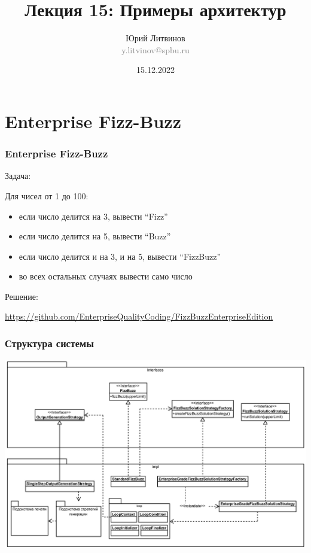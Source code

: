 \documentclass[xetex,mathserif,serif]{beamer}
\title{Лекция 15: Примеры архитектур}
\author[Юрий Литвинов]{Юрий Литвинов\\\small{\textcolor{gray}{y.litvinov@spbu.ru}}}
\date{15.12.2022}
\begin{document}
    \frame{\titlepage}
    \section{Enterprise Fizz-Buzz}

    \begin{frame}
        \frametitle{Enterprise Fizz-Buzz}
        Задача:

        Для чисел от 1 до 100:
        \begin{itemize}
            \item если число делится на 3, вывести ``Fizz''
            \item если число делится на 5, вывести ``Buzz''
            \item если число делится и на 3, и на 5, вывести ``FizzBuzz''
            \item во всех остальных случаях вывести само число
        \end{itemize}

        Решение:

        \url{https://github.com/EnterpriseQualityCoding/FizzBuzzEnterpriseEdition}
    \end{frame}

    \begin{frame}
        \frametitle{Структура системы}
        \begin{center}
            \includegraphics[width=\textwidth]{fizzBuzzArchitecture.png}
        \end{center}
    \end{frame}
\end{document}
